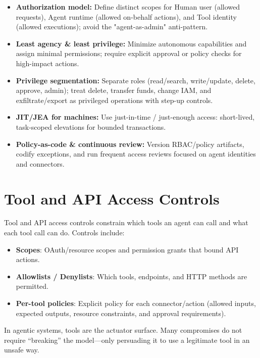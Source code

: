 \begin{TNtwocol}
    \begin{itemize}
        \item \textbf{Authorization model:} Define distinct scopes for Human user (allowed requests), Agent runtime (allowed on-behalf actions), and Tool identity (allowed executions); avoid the "agent-as-admin" anti-pattern.
        \item \textbf{Least agency \& least privilege:} Minimize autonomous capabilities and assign minimal permissions; require explicit approval or policy checks for high-impact actions.
        \item \textbf{Privilege segmentation:} Separate roles (read/search, write/update, delete, approve, admin); treat delete, transfer funds, change IAM, and exfiltrate/export as privileged operations with step-up controls.
        \item \textbf{JIT/JEA for machines:} Use just-in-time / just-enough access: short-lived, task-scoped elevations for bounded transactions.
        \item \textbf{Policy-as-code \& continuous review:} Version RBAC/policy artifacts, codify exceptions, and run frequent access reviews focused on agent identities and connectors.
    \end{itemize}

    \section{Tool and API Access Controls }

    Tool and API access controls constrain which tools an agent can call and what each tool call can do. Controls include:

    \begin{itemize}
        \item \textbf{Scopes}: OAuth/resource scopes and permission grants that bound API actions.
        \item \textbf{Allowlists / Denylists}: Which tools, endpoints, and HTTP methods are permitted.
        \item \textbf{Per-tool policies}: Explicit policy for each connector/action (allowed inputs, expected outputs, resource constraints, and approval requirements).
    \end{itemize}

    In agentic systems, tools are the actuator surface. Many compromises do not require “breaking” the model—only persuading it to use a legitimate tool in an unsafe way.


\end{TNtwocol}
